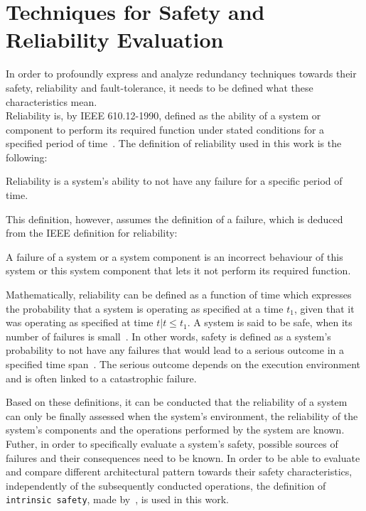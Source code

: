 \section{Techniques for Safety and Reliability Evaluation}
In order to profoundly express and analyze redundancy techniques towards their safety, reliability and fault-tolerance, it needs to be defined what these characteristics mean.
\\

Reliability is, by IEEE 610.12-1990, defined as the ability of a system or component to perform its required function under stated conditions for a specified period of time~\cite{ieee610.12}.
The definition of reliability used in this work is the following:

\begin{definition}
Reliability is a system's ability to not have any failure for a specific period of time.
\end{definition}

This definition, however, assumes the definition of a failure, which is deduced from the IEEE definition for reliability:

\begin{definition}
A failure of a system or a system component is an incorrect behaviour of this system or this system component that lets it not perform its required function.
\end{definition}

Mathematically, reliability can be defined as a function of time which expresses the probability that a system is operating as specified at a time $t_1$, given that it was operating as specified at time $t | t \leq t_1$.
A system is said to be safe, when its number of failures is small~\cite{HollnagelSafety}.
In other words, safety is defined as a system's probability to not have any failures that would lead to a serious outcome in a specified time span~\cite{GeffroyMotetDependableComputing}.
The serious outcome depends on the execution environment and is often linked to a catastrophic failure.

Based on these definitions, it can be conducted that the reliability of a system can only be finally assessed when the system's environment, the reliability of the system's components and the operations performed by the system are known.
Futher, in order to specifically evaluate a system's safety, possible sources of failures and their consequences need to be known.
In order to be able to evaluate and compare different architectural pattern towards their safety characteristics, independently of the subsequently conducted operations, the definition of \texttt{intrinsic safety}, made by~\cite{BoulangerStandards}, is used in this work.

